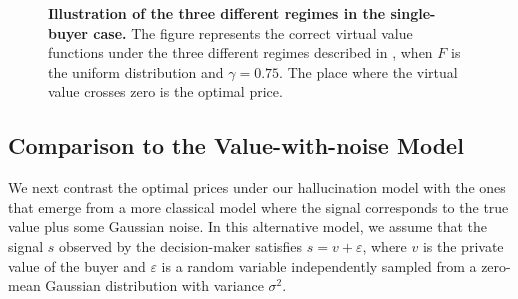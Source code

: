 \begin{figure}[h!]
{
    }
    \caption{\textbf{Illustration of the three different regimes in the single-buyer case.} The figure represents the correct virtual value functions under the three different regimes described in , when $F$ is the uniform distribution and $\gamma = 0.75$. The place where the virtual value crosses zero is the optimal price.}
    \label{fig:single_buyer}
    \end{figure}


\subsection{Comparison to the Value-with-noise Model} \label{sec:noise}
We next contrast the optimal prices under our hallucination model with the ones that emerge from a more classical model where the signal corresponds to the true value plus some Gaussian noise.
 In this alternative model, we assume that the signal $s$ observed by the decision-maker satisfies $s = v + \varepsilon$, where $v$ is the private value of the buyer and $\varepsilon$ is a random variable independently sampled from a zero-mean Gaussian distribution with variance $\sigma^2$.

